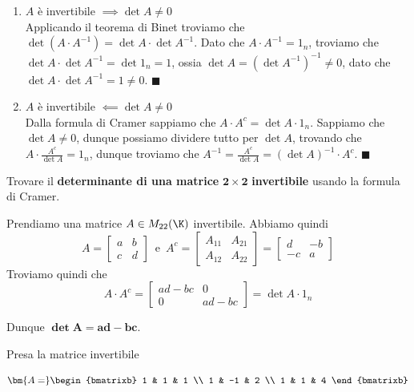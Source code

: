 \documentclass[11pt, a4paper, titlepage, oneside]{scrbook}
\begin{document}
\Dimostrazione \nopagebreak

\begin{enumerate}[label=\arabic*°]
    \item $A$ è invertibile $\implies \det A \neq 0$ \\
    Applicando il teorema di Binet troviamo che $\det (A \cdot A^{-1}) = \det A \cdot \det A^{-1}$. Dato che $A \cdot A^{-1} = 1_n$, troviamo che $\det A \cdot \det A^{-1} = \det 1_n = 1$, ossia $\det A = (\det A^{-1})^{-1} \neq 0$, dato che $\det A \cdot \det A^{-1} = 1 \neq 0$. $\blacksquare$
    \item $A$ è invertibile $\impliedby \det A \neq 0$ \\
    Dalla formula di Cramer sappiamo che $A \cdot A^c = \det A \cdot 1_n$. Sappiamo che $\det A \neq 0$, dunque possiamo dividere tutto per $\det A$, trovando che $A \cdot \frac{A^c}{\det A} = 1_n$, dunque troviamo che $A^{-1} = \frac{A^c}{\det A} = (\det A)^{-1} \cdot A^c$. $\blacksquare$ 
\end{enumerate}

\Esempi \nopagebreak

Trovare il \textbf{determinante di una matrice} $\bm{2 \times 2}$ \textbf{invertibile} usando la formula di Cramer. \nopagebreak

Prendiamo una matrice $A \in M_{22}(\K)$ invertibile. Abbiamo quindi
\[
A = \begin{bmatrix}
    a &  b \\
    c & d
\end{bmatrix}
\enspace \text{e} \enspace A^c = \begin{bmatrix}
    A_{11} & A_{21} \\
    A_{12} & A_{22}
\end{bmatrix} = \begin{bmatrix}
    d & -b \\
    -c & a
\end{bmatrix}
\]
Troviamo quindi che
\[
A \cdot A^c = \begin{bmatrix}
    ad - bc & 0 \\
    0 & ad-bc
\end{bmatrix} = \det A \cdot 1_n
\]

Dunque $\bm{\det A = ad -bc}$. 

\Separatore

Presa la matrice invertibile

\[
\bm{A =} \begin{bmatrixb}
    1 & 1 & 1 \\
    1 & -1 & 2 \\
    1 & 1 & 4
\end{bmatrixb}
\]
\end{document}
